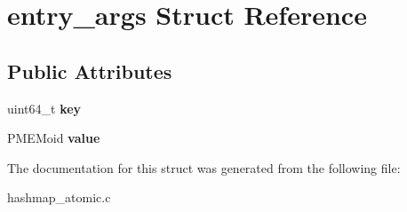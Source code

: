 \hypertarget{structentry__args}{}\section{entry\+\_\+args Struct Reference}
\label{structentry__args}
\subsection*{Public Attributes}
\begin{DoxyCompactItemize}
\item 
uint64\+\_\+t {\bfseries key}\hypertarget{structentry__args_aba46158e3af0f0f4701ea742f7e05697}{}\label{structentry__args_aba46158e3af0f0f4701ea742f7e05697}

\item 
P\+M\+E\+Moid {\bfseries value}\hypertarget{structentry__args_a8a910e88fcd1bb7d94aa52080d6abb08}{}\label{structentry__args_a8a910e88fcd1bb7d94aa52080d6abb08}

\end{DoxyCompactItemize}


The documentation for this struct was generated from the following file\+:\begin{DoxyCompactItemize}
\item 
hashmap\+\_\+atomic.\+c\end{DoxyCompactItemize}
